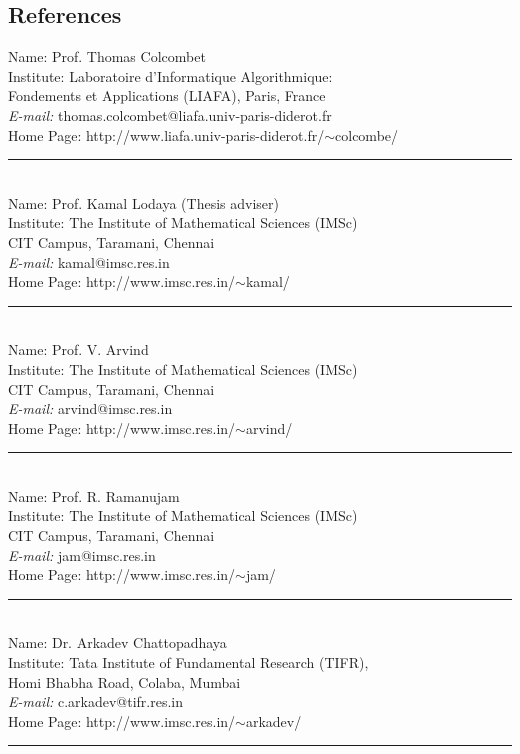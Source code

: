 \documentclass[margin]{res}
\begin{document}
\begin{resume}
\section{References}
			Name: 		Prof. Thomas Colcombet \\
			Institute: 	Laboratoire d{'}Informatique Algorithmique:  \\
			Fondements et Applications (LIAFA), Paris, France	\\
			\emph{E-mail:} {thomas.colcombet@liafa.univ-paris-diderot.fr} \\
			Home Page: http://www.liafa.univ-paris-diderot.fr/$\sim$colcombe/ \\
			\noindent\rule{13cm}{0.4pt} \\					
			Name: 		Prof. Kamal Lodaya (Thesis adviser) \\
			Institute: 	The Institute of Mathematical Sciences (IMSc) \\
			CIT Campus, Taramani, Chennai	\\
			\emph{E-mail:} {kamal@imsc.res.in} \\
			Home Page: http://www.imsc.res.in/$\sim$kamal/ \\
			\noindent\rule{13cm}{0.4pt} \\					
			Name: 		Prof. V. Arvind \\
			Institute: 	The Institute of Mathematical Sciences (IMSc) \\
			CIT Campus, Taramani, Chennai	\\
			\emph{E-mail:} {arvind@imsc.res.in} \\
			Home Page: http://www.imsc.res.in/$\sim$arvind/ \\
			\noindent\rule{13cm}{0.4pt} \\					
			Name: 		Prof. R. Ramanujam \\
			Institute: 	The Institute of Mathematical Sciences (IMSc) \\
			CIT Campus, Taramani, Chennai	\\
			\emph{E-mail:} {jam@imsc.res.in} \\
			Home Page: http://www.imsc.res.in/$\sim$jam/ \\
			\noindent\rule{13cm}{0.4pt} \\					
			Name: 		Dr. Arkadev Chattopadhaya \\
			Institute: 	Tata Institute of Fundamental Research (TIFR), \\
			Homi Bhabha Road, Colaba, Mumbai	\\
			\emph{E-mail:} {c.arkadev@tifr.res.in} \\
			Home Page: http://www.imsc.res.in/$\sim$arkadev/ \\
			\noindent\rule{13cm}{0.4pt} \\					
			
\end{resume}
\end{document}
